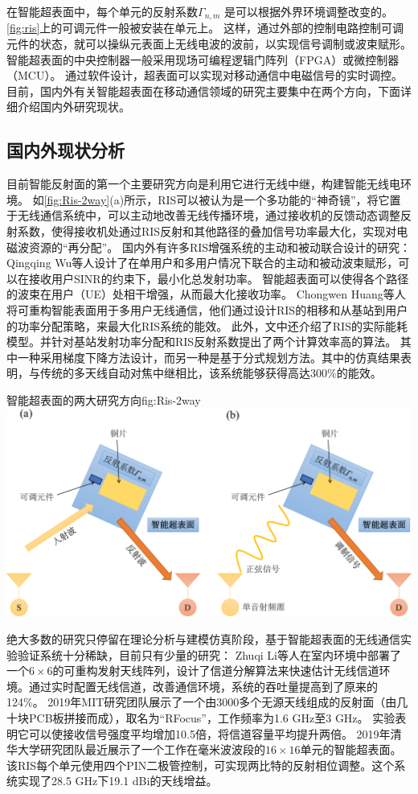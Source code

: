 \documentclass[supercite]{HustGraduPaper}
\begin{document}
在智能超表面中，每个单元的反射系数$ \Gamma _ {n,m} $ 是可以根据外界环境调整改变的。
\autoref{fig:ris}上的可调元件一般被安装在单元上。
这样，通过外部的控制电路控制可调元件的状态，就可以操纵元表面上无线电波的波前，以实现信号调制或波束赋形。
智能超表面的中央控制器一般采用现场可编程逻辑门阵列（FPGA）或微控制器（MCU）。
通过软件设计，超表面可以实现对移动通信中电磁信号的实时调控。目前，国内外有关智能超表面在移动通信领域的研究主要集中在两个方向\cite{CHN_zhou2020}，下面详细介绍国内外研究现状。

\subsection{国内外现状分析}


目前智能反射面的第一个主要研究方向是利用它进行无线中继，构建智能无线电环境。
如\autoref{fig:Ris-2way}(a)所示，RIS可以被认为是一个多功能的“神奇镜”，将它置于无线通信系统中，可以主动地改善无线传播环境，通过接收机的反馈动态调整反射系数，使得接收机处通过RIS反射和其他路径的叠加信号功率最大化，实现对电磁波资源的“再分配”。
国内外有许多RIS增强系统的主动和被动联合设计的研究：Qingqing Wu等人设计了在单用户和多用户情况下联合的主动和被动波束赋形，可以在接收用户SINR的约束下，最小化总发射功率\cite{Wu2019}。
智能超表面可以使得各个路径的波束在用户（UE）处相干增强，从而最大化接收功率。
Chongwen Huang等人将可重构智能表面用于多用户无线通信，他们通过设计RIS的相移和从基站到用户的功率分配策略，来最大化RIS系统的能效。
此外，文中还介绍了RIS的实际能耗模型。并针对基站发射功率分配和RIS反射系数提出了两个计算效率高的算法。
其中一种采用梯度下降方法设计，而另一种是基于分式规划方法。其中的仿真结果表明，与传统的多天线自动对焦中继相比，该系统能够获得高达300\%的能效\cite{Huang2018a}。

\begin{generalfig}[htb]{智能超表面的两大研究方向}{fig:Ris-2way}
	\includegraphics[width=0.8\linewidth]{Figures/Ris-2way.pdf}
\end{generalfig}

绝大多数的研究只停留在理论分析与建模仿真阶段，基于智能超表面的无线通信实验验证系统十分稀缺，目前只有少量的研究：
Zhuqi Li等人在室内环境中部署了一个$ 6 \times 6 $的可重构发射天线阵列，设计了信道分解算法来快速估计无线信道环境\cite{li2019towards}。通过实时配置无线信道，改善通信环境，系统的吞吐量提高到了原来的124\%。
2019年MIT研究团队展示了一个由3000多个无源天线组成的反射面（由几十块PCB板拼接而成），取名为“RFocus”，工作频率为1.6 GHz至3 GHz。
实验表明它可以使接收信号强度平均增加10.5倍，将信道容量平均提升两倍\cite{arun2019rfocus}。
2019年清华大学研究团队最近展示了一个工作在毫米波波段的$ 16 \times 16 $单元的智能超表面。
该RIS每个单元使用四个PIN二极管控制，可实现两比特的反射相位调整。这个系统实现了28.5 GHz下19.1 dBi的天线增益\cite{Dai2020}。
\end{document}
